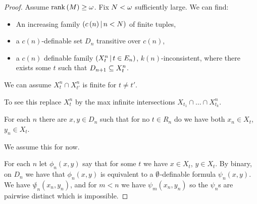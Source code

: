 \documentclass{amsart}
\begin{document}
\begin{proof}
Assume $\operatorname{rank}\left(M\right)\geq \omega$. Fix $N< \omega$ sufficiently large. 
We can find:
\begin{itemize}
\item An increasing family $\left(c\left(n\right) \, \middle\vert \, n < N\right)$ of finite tuples,
\item a $c\left(n\right)$-definable set $D_n$ transitive over $c\left(n\right)$,
\item a $c\left(n\right)$ definable family $\left(X_t^n \, \middle\vert \, t\in E_n\right)$,
$k\left(n\right)$-inconsistent, where there exists some $t$ such that $D_{n+1}\subseteq
X_t^n$.
\end{itemize}
\begin{clm}
We can assume $X_t^n\cap X_{t'}^n$ is finite for $t\neq t'$.
\end{clm}
To see this replace $X_t^n$ by the max infinite intersections $X_{t_1}\cap \ldots \cap
X_{t_k}^n$.
\begin{clm}
For each $n$ there are $x,y\in D_n$ such that for no $t\in R_n$ do we have both $x_n\in
X_t$, $y_n\in X_t$.
\end{clm}
We assume this for now.

For each $n$ let $\phi_n\left(x,y\right)$ say that for some $t$ we have $x\in X_t$, $y\in X_t$.
By binary, on $D_n$ we have that $\phi_n\left(x,y\right)$ is equivalent to a
$\emptyset$-definable formula $\psi_n\left(x,y\right)$.
We have $\not \psi_n\left(x_n , y_n\right)$, and for $m < n$ we have
$\psi_m \left(x_n , y_n\right)$ so the $\psi_n$s are pairwise distinct which is
impossible.
\end{proof}
\end{document}
